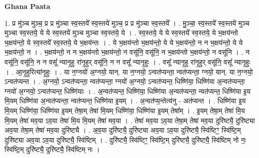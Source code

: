 \documentclass[17pt]{extarticle}
\begin{document}
\textbf{Ghana Paata } \newline

1. प्र मु॑ञ्च मुञ्च॒ प्र प्र मु॑ञ्चा स्व॒स्तये᳚ स्व॒स्तये॑ मुञ्च॒ प्र प्र मु॑ञ्चा स्व॒स्तये᳚ । . मु॒ञ्चा॒ स्व॒स्तये᳚ स्व॒स्तये॑ मुञ्च मुञ्चा स्व॒स्तये॒ ये ये स्व॒स्तये॑ मुञ्च मुञ्चा स्व॒स्तये॒ ये । . स्व॒स्तये॒ ये ये स्व॒स्तये᳚ स्व॒स्तये॒ ये भ॒क्षय॑न्तो भ॒क्षय॑न्तो॒ ये स्व॒स्तये᳚ स्व॒स्तये॒ ये भ॒क्षय॑न्तः । . ये भ॒क्षय॑न्तो भ॒क्षय॑न्तो॒ ये ये भ॒क्षय॑न्तो॒ न न भ॒क्षय॑न्तो॒ ये ये भ॒क्षय॑न्तो॒ न । . भ॒क्षय॑न्तो॒ न न भ॒क्षय॑न्तो भ॒क्षय॑न्तो॒ न वसू॑नि॒ वसू॑नि॒ न भ॒क्षय॑न्तो भ॒क्षय॑न्तो॒ न वसू॑नि । . न वसू॑नि॒ वसू॑नि॒ न न वसू᳚ न्यानृ॒हु रा॑नृ॒हुर् वसू॑नि॒ न न वसू᳚ न्यानृ॒हुः । . वसू᳚ न्यानृ॒हु रा॑नृ॒हुर् वसू॑नि॒ वसू᳚ न्यानृ॒हुः । . आ॒नृ॒हुरित्या॑नृ॒हुः । . या न॒ग्नयो॑ अ॒ग्नयो॒ यान्. या न॒ग्नयो॒ ऽन्वत॑प्यन्ता॒ न्वत॑प्यन्ता॒ ग्नयो॒ यान्. या न॒ग्नयो॒ ऽन्वत॑प्यन्त । . अ॒ग्नयो॒ ऽन्वत॑प्यन्ता॒ न्वत॑प्यन्ता॒ ग्नयो॑ अ॒ग्नयो॒ ऽन्वत॑प्यन्त॒ धिष्णि॑या॒ धिष्णि॑या अ॒न्वत॑प्यन्ता॒ ग्नयो॑ अ॒ग्नयो॒ ऽन्वत॑प्यन्त॒ धिष्णि॑याः । . अ॒न्वत॑प्यन्त॒ धिष्णि॑या॒ धिष्णि॑या अ॒न्वत॑प्यन्ता॒ न्वत॑प्यन्त॒ धिष्णि॑या इ॒य मि॒यम् धिष्णि॑या अ॒न्वत॑प्यन्ता॒ न्वत॑प्यन्त॒ धिष्णि॑या इ॒यम् । . अ॒न्वत॑प्य॒न्तेत्य॑नु - अत॑प्यन्त । . धिष्णि॑या इ॒य मि॒यम् धिष्णि॑या॒ धिष्णि॑या इ॒यम् तेषा॒म् तेषा॑ मि॒यम् धिष्णि॑या॒ धिष्णि॑या इ॒यम् तेषा᳚म् । . इ॒यम् तेषा॒म् तेषा॑ मि॒य मि॒यम् तेषा॑ मव॒या ऽव॒या तेषा॑ मि॒य मि॒यम् तेषा॑ मव॒या । . तेषा॑ मव॒या ऽव॒या तेषा॒म् तेषा॑ मव॒या दुरि॑ष्ट्यै॒ दुरि॑ष्ट्या अव॒या तेषा॒म् तेषा॑ मव॒या दुरि॑ष्ट्यै । . अ॒व॒या दुरि॑ष्ट्यै॒ दुरि॑ष्ट्या अव॒या ऽव॒या दुरि॑ष्ट्यै॒ स्वि॑ष्टिꣳ॒॒ स्वि॑ष्टि॒म् दुरि॑ष्ट्या अव॒या ऽव॒या दुरि॑ष्ट्यै॒ स्वि॑ष्टिम् । . दुरि॑ष्ट्यै॒ स्वि॑ष्टिꣳ॒॒ स्वि॑ष्टि॒म् दुरि॑ष्ट्यै॒ दुरि॑ष्ट्यै॒ स्वि॑ष्टिम् नो नः॒ स्वि॑ष्टि॒म् दुरि॑ष्ट्यै॒ दुरि॑ष्ट्यै॒ स्वि॑ष्टिम् नः । \newline
\end{document}
